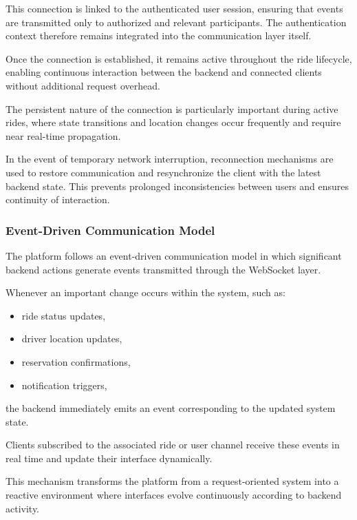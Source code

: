 This connection is linked to the authenticated user session, ensuring that events are transmitted only to authorized and relevant participants. The authentication context therefore remains integrated into the communication layer itself.

Once the connection is established, it remains active throughout the ride lifecycle, enabling continuous interaction between the backend and connected clients without additional request overhead.

The persistent nature of the connection is particularly important during active rides, where state transitions and location changes occur frequently and require near real-time propagation.

In the event of temporary network interruption, reconnection mechanisms are used to restore communication and resynchronize the client with the latest backend state. This prevents prolonged inconsistencies between users and ensures continuity of interaction.


\subsubsection{Event-Driven Communication Model}

The platform follows an event-driven communication model in which significant backend actions generate events transmitted through the WebSocket layer.

Whenever an important change occurs within the system, such as:

\begin{itemize}
    \item ride status updates,
    \item driver location updates,
    \item reservation confirmations,
    \item notification triggers,
\end{itemize}

the backend immediately emits an event corresponding to the updated system state.

Clients subscribed to the associated ride or user channel receive these events in real time and update their interface dynamically.

This mechanism transforms the platform from a request-oriented system into a reactive environment where interfaces evolve continuously according to backend activity.

